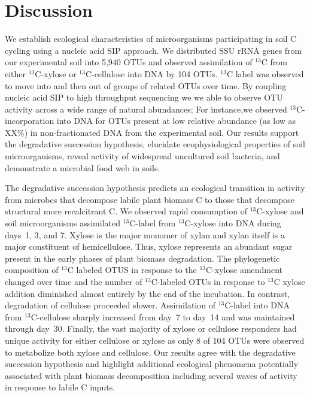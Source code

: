 \section{Discussion} 
We establish ecological characteristics of microorganisms participating in soil
C cycling using a nucleic acid SIP approach. We distributed SSU rRNA genes from
our experimental soil into 5,940 OTUs and observed assimilation of $^{13}$C
from either $^{13}$C-xylose or $^{13}$C-cellulose into DNA by 104 OTUs.
$^{13}$C label was observed to move into and then out of groups of related OTUs
over time. By coupling nucleic acid SIP to high throughput sequencing we we
able to observe OTU activity across a wide range of natural abundances; For
instance,we observed $^{13}$C-incorporation into DNA for OTUs present at low
relative abundance (as low as XX\%) in non-fractionated DNA from the
experimental soil. Our results support the degradative succession hypothesis,
elucidate ecophysiological properties of soil microorganisms, reveal activity
of widespread uncultured soil bacteria, and demonstrate a microbial food web in
soils. 

The degradative succession hypothesis predicts an ecological transition in
activity from microbes that decompose labile plant biomass C to those that
decompose structural more recalcitrant C. We observed rapid consumption of
$^{13}$C-xylose and soil microorganisms assimilated $^{13}$C-label from
$^{13}$C-xylose into DNA during days~1, 3, and 7. Xylose is the major monomer
of xylan and xylan itself is a major constituent of hemicellulose. Thus, xylose
represents an abundant sugar present in the early phases of plant biomass
degradation. The phylogenetic composition of $^{13}$C labeled OTUS in response
to the $^{13}$C-xylose amendment changed over time and the number of
$^{13}$C-labeled OTUs in response to $^{13}$C xylose addition diminished almost
entirely by the end of the incubation. In contrast, degradation of cellulose
proceeded slower. Assimilation of $^{13}$C-label into DNA from
$^{13}$C-cellulose sharply increased from day~7 to day~14 and was maintained
through day~30. Finally, the vast majority of xylose or cellulose responders
had unique activity for either cellulose or xylose as only 8 of 104 OTUs were
observed to metabolize both xylose and cellulose. Our results agree with the
degradative succession hypothesis and highlight additional ecological phenomena
potentially associated with plant biomass decomposition including several waves
of activity in response to labile C inputs.  

